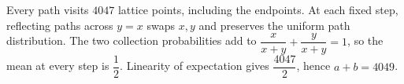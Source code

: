 Every path visits $4047$ lattice points, including the endpoints. At each fixed step, reflecting paths across $y=x$ swaps $x,y$ and preserves the uniform path distribution. The two collection probabilities add to $\dfrac{x}{x+y}+\dfrac{y}{x+y}=1$, so the mean at every step is $\dfrac{1}{2}$. Linearity of expectation gives $\dfrac{4047}{2}$, hence $\boxed{a+b=4049}$.
